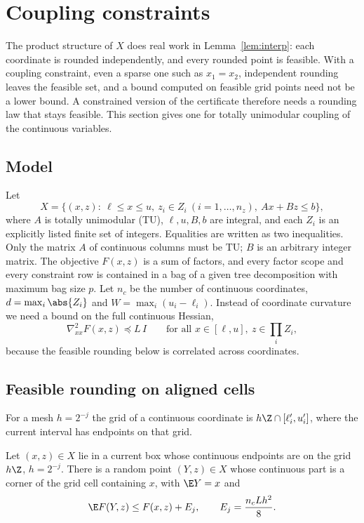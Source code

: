 \section{Coupling constraints}\label{sec:constraints}

The product structure of $X$ does real work in Lemma~\ref{lem:interp}:
each coordinate is rounded independently, and every rounded point is
feasible. With a coupling constraint, even a sparse one such as
$x_1=x_2$, independent rounding leaves the feasible set, and a bound
computed on feasible grid points need not be a lower bound. A constrained
version of the certificate therefore needs a rounding law that stays
feasible. This section gives one for totally unimodular coupling of the
continuous variables.

\subsection{Model}
Let
\begin{equation}\label{eq:tumodel}
X=\{(x,z):\ \ell\le x\le u,\ z_i\in Z_i\ (i=1,\dots,n_z),\ Ax+Bz\le b\},
\end{equation}
where $A$ is totally unimodular (TU), $\ell,u,B,b$ are integral, and each
$Z_i$ is an explicitly listed finite set of integers. Equalities are
written as two inequalities. Only the matrix $A$ of continuous columns must
be TU; $B$ is an arbitrary integer matrix. The objective $F(x,z)$ is a sum of
factors, and every factor scope and every constraint row is contained in a
bag of a given tree decomposition with maximum bag size $p$. Let $n_c$ be
the number of continuous coordinates, $d=\max_i\abs{Z_i}$ and
$W=\max_i(u_i-\ell_i)$. Instead of coordinate curvature we need a bound on
the full continuous Hessian,
\begin{equation}\label{eq:fullcurv}
\nabla^2_{xx}F(x,z)\preceq L\,I\qquad\text{for all }x\in[\ell,u],\ z\in\textstyle\prod_iZ_i ,
\end{equation}
because the feasible rounding below is correlated across coordinates.

\subsection{Feasible rounding on aligned cells}
For a mesh $h=2^{-j}$ the grid of a continuous coordinate is $h\Z\cap[\ell_i',u_i']$,
where the current interval has endpoints on that grid.

\begin{lemma}\label{lem:tu-round}
Let $(x,z)\in X$ lie in a current box whose continuous endpoints are on the
grid $h\Z$, $h=2^{-j}$. There is a random point $(Y,z)\in X$ whose continuous
part is a corner of the grid cell containing $x$, with $\E Y=x$ and
\[
\E F(Y,z)\le F(x,z)+E_j,\qquad E_j=\frac{n_cLh^2}{8}.
\]
\end{lemma}

